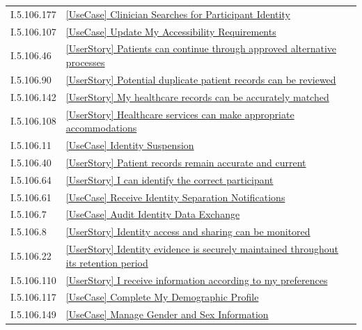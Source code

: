 \begin{longtable}{p{.22\linewidth}p{.73\linewidth}}
I.5.106.177 & \hyperref[element:3e96d58f4092462382daeab75134ad0e]{[UseCase] Clinician Searches for Participant Identity} \\
I.5.106.107 & \hyperref[element:40ec8c08267d44fcbe29b19bc212021b]{[UseCase] Update My Accessibility Requirements} \\
I.5.106.46 & \hyperref[element:420d5027747146fe92474a78983dbe54]{[UserStory] Patients can continue through approved alternative processes} \\
I.5.106.90 & \hyperref[element:4304188c3e884657a10effcfcebbbead]{[UserStory] Potential duplicate patient records can be reviewed} \\
I.5.106.142 & \hyperref[element:4318dbfc0f6f4e59b72cf8c8a8a0f895]{[UserStory] My healthcare records can be accurately matched} \\
I.5.106.108 & \hyperref[element:43212898b01042e1b1cd66282dacc9bb]{[UserStory] Healthcare services can make appropriate accommodations} \\
I.5.106.11 & \hyperref[element:4347ff36903c40d4a38da7709aeb1581]{[UseCase] Identity Suspension} \\
I.5.106.40 & \hyperref[element:44bac53fcd884fa0bc660747743da0e7]{[UserStory] Patient records remain accurate and current} \\
I.5.106.64 & \hyperref[element:458e350910ca4671a0f2968b73779f3b]{[UserStory] I can identify the correct participant} \\
I.5.106.61 & \hyperref[element:46d4de15cca74d24b6799b82d626c46d]{[UseCase] Receive Identity Separation Notifications} \\
I.5.106.7 & \hyperref[element:479068521a1247b1b9df87c6e32915a7]{[UseCase] Audit Identity Data Exchange} \\
I.5.106.8 & \hyperref[element:48cf293260dc4beaa537c1d68bc58ff4]{[UserStory] Identity access and sharing can be monitored} \\
I.5.106.22 & \hyperref[element:49771ad01d58409995e718493d57b1c4]{[UserStory] Identity evidence is securely maintained throughout its retention period} \\
I.5.106.110 & \hyperref[element:4a6ca9fe211442c8a09756155874d800]{[UserStory] I receive information according to my preferences} \\
I.5.106.117 & \hyperref[element:4ba35725b6a140f5a4dd4c2ff4f30821]{[UseCase] Complete My Demographic Profile} \\
I.5.106.149 & \hyperref[element:4d5b507169cf47a0aca7afceabaad837]{[UseCase] Manage Gender and Sex Information} \\

\end{longtable}
